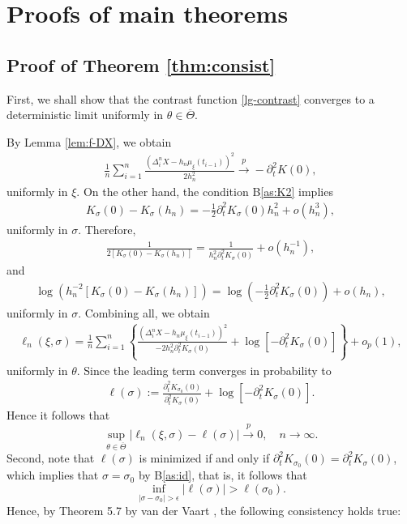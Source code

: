 \documentclass[a4paper,10pt,twoside]{article}
\numberwithin{equation}{section}
\def\e{{\epsilon}}
\def\l{\left}
\def\r{\right}
\def\th{\theta}
\def\s{\sigma}
\def\p{\partial}
\def\toP{\stackrel{p}{\longrightarrow}}
\def\ol#1{\overline{#1}}
\begin{document}
\section{Proofs of main theorems}\label{sec:proof}

\subsection{Proof of Theorem \ref{thm:consist}}
First, we shall show that the contrast function \eqref{lg-contrast} converges to a deterministic limit uniformly in $\th\in \ol{\Theta}$. 

By Lemma \ref{lem:f-DX}, we obtain
\begin{align*}
\frac{1}{n} \sum_{i=1}^n  \frac{(\Delta_i^n X - h_n \mu_\xi(t_{i-1}))^2}{2 h_n^2}  \toP - \p_t^2 K(0),
\end{align*}
uniformly in $\xi$. On the other hand, the condition B\ref{as:K2} implies
\begin{align*}
K_\sigma(0) - K_\sigma(h_n) = -\frac{1}{2} \p_t^2 K_\sigma(0) h_n^2 + o(h_n^3),
\end{align*}
uniformly in $\s$. Therefore,
\begin{align*}
\frac{1}{2 [K_\sigma(0) - K_\sigma(h_n)]} = \frac{1}{h_n^2 \p_t^2 K_\sigma(0)} + o(h_n^{-1}), 
\end{align*}
and
\begin{align*}
\log(h_n^{-2}[K_\sigma(0) - K_\sigma(h_n)]) = \log\l( -\frac{1}{2} \p_t^2 K_\sigma(0) \r) + o(h_n),
\end{align*}
uniformly in $\s$. Combining all, we obtain
\begin{align*}
\ell_n(\xi,\s) = \frac{1}{n} \sum_{i=1}^n \l\{ \frac{(\Delta_i^n X - h_n \mu_\xi(t_{i-1}))^2}{-2 h_n^2 \p_t^2 K_\sigma(0)} + \log[-\p_t^2 K_\sigma(0)] \r\} + o_p(1),
\end{align*}
uniformly in $\th$. Since the leading term converges in probability to
\begin{align*}
\ell(\s) := \frac{\p_t^2 K_{\s_0}(0)}{\p_t^2 K_\sigma(0)} + \log[-\p_t^2 K_\sigma(0)]. 
\end{align*}
Hence it follows that 
\[
\sup_{\th \in \ol{\Theta}}\l|\ell_n(\xi,\s) - \ell(\s)\r| \toP 0,\quad n\to \infty. 
\]
Second, note that $\ell(\s)$ is minimized if and only if $\partial_t^2 K_{\sigma_0}(0) = \partial_t^2 K_\sigma(0)$, which implies that $\s=\s_0$ by B\ref{as:id}, that is, it follows that 
\[
\inf_{|\s - \s_0|>\e} |\ell(\s)| > \ell(\s_0). 
\]
Hence, by Theorem 5.7 by van der Vaart \cite{v98}, the following consistency holds true: 
\end{document}
